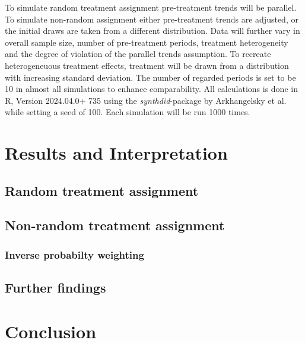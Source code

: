 \documentclass[8pt]{article}
\begin{document}
To simulate random treatment assignment pre-treatment trends will be parallel. To simulate non-random assignment either pre-treatment trends are adjusted, or the initial draws are taken from a different distribution. Data will further vary in overall sample size, number of pre-treatment periods, treatment heterogeneity and the degree of violation of the parallel trends assumption. To recreate heterogeneuous treatment effects, treatment will be drawn from a distribution with increasing standard deviation. The number of regarded periods is set to be 10 in almost all simulations to enhance comparability. 
All calculations is done in R, Version 2024.04.0+ 735 using the \textit{synthdid}-package by Arkhangelsky et al. while setting a seed of 100. Each simulation will be run 1000 times. 


\section{Results and Interpretation}
\cite{abadie_economic_2003}

\subsection{Random treatment assignment}

\subsection{Non-random treatment assignment}

\subsubsection{Inverse probabilty weighting}

\subsection{Further findings}


\section{Conclusion}



\printbibliography
\end{document}
